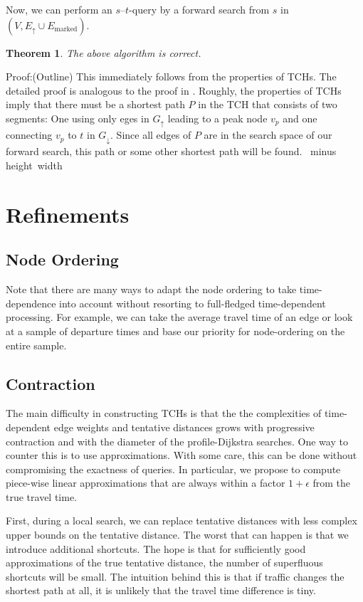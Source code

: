 \documentclass[12pt]{article}
\def\endofbeweis{~\quad\hglue\hsize minus\hsize
                 \hbox{\vrule height \endofsize width
\endofsize}\par}
\newenvironment{proof}{Proof:}{\endofbeweis}
\newcommand{\Gup}{G_{\uparrow}}
\newcommand{\Gdown}{G_{\downarrow}}
\newcommand{\Eup}{E_{\uparrow}}
\newcommand{\Emarked}{E_{\mathrm{marked}}}
\newtheorem{theorem}{Theorem}
\begin{document}
Now, we can perform an $s$--$t$-query by a forward search from $s$ in
$(V, \Eup\cup\Emarked)$. 

\begin{theorem}
The above algorithm is correct.
\end{theorem}
\begin{proof}(Outline)
This immediately follows from the properties of TCHs.
The detailed proof is analogous to the proof in \cite{Gei08}. 
Roughly, the properties of TCHs imply that there
must be a shortest path $P$ in the TCH that consists of two segments:
One using only eges in $\Gup$ leading to a peak node $v_p$ and
one connecting $v_p$ to $t$ in $\Gdown$. Since all edges of $P$ are
in the search space of our forward search, this path or some other
shortest path will be found.  
\end{proof}



\section{Refinements}\label{ss:crefinements}

\subsection{Node Ordering}\label{ss:orefinements}

Note that there are many ways to adapt the
node ordering to take time-dependence into account without resorting
to full-fledged time-dependent processing. For example, we can take
the average travel time of an edge or look at a sample of departure times
and base our priority for node-ordering on the entire sample.

\subsection{Contraction}\label{ss:crefinements}

The main difficulty in constructing TCHs is that 
the the complexities of time-dependent edge weights and
tentative distances grows with progressive contraction
and with the diameter of the profile-Dijkstra searches.
One way to counter this is to use approximations.
With some care, this can be done without compromising 
the exactness of queries.
In particular, we propose to compute piece-wise linear
approximations that are always within a factor $1+\epsilon$ from the
true travel time.

First, during a local search, we can replace tentative distances with less complex
upper bounds on the tentative distance.
The worst that can happen is that we introduce additional shortcuts.
The hope is that for sufficiently good approximations of the true
tentative distance, the number of superfluous shortcuts will be small.
The intuition behind this is that if traffic changes the shortest path at all,
it is unlikely that the travel time difference is tiny.  
\end{document}

